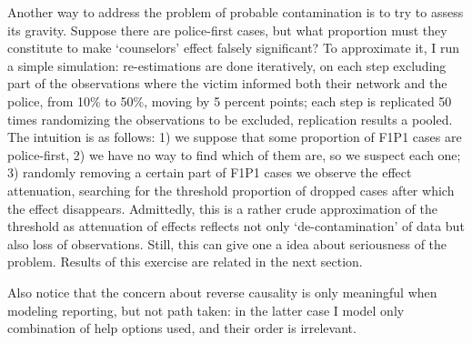 \documentclass[]{interact}
\theoremstyle{plain}%
\theoremstyle{definition}
\theoremstyle{remark}
\begin{document}
	Another way to address the problem of probable contamination is to try to assess its gravity. Suppose there are police-first cases, but what proportion must they constitute to make `counselors' effect falsely significant? To approximate it, I run a simple simulation: re-estimations are done iteratively, on each step excluding part of the observations where the victim informed both their network and the police, from 10\% to 50\%, moving by 5 percent points; each step is replicated 50 times randomizing the observations to be excluded, replication results a pooled. The intuition is as follows: 1) we suppose that some proportion of F1P1 cases are police-first, 2) we have no way to find which of them are, so we suspect each one; 3) randomly removing a certain part of F1P1 cases we observe the effect attenuation, searching for the threshold proportion of dropped cases after which the effect disappears. Admittedly, this is a rather crude approximation of the threshold as attenuation of effects reflects not only `de-contamination' of data but also loss of observations. Still, this can give one a idea about seriousness of the problem. Results of this exercise are related in the next section.
	
	Also notice that the concern about reverse causality is only meaningful when modeling reporting, but not path taken: in the latter case I model only combination of help options used, and their order is irrelevant. 
	
\end{document}
